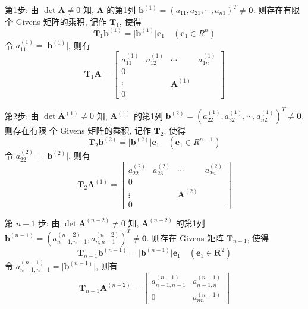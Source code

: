 \par 第1步: 由 $\det \bm{A} \neq 0$ 知, $\bm{A}$ 的第1列 $\bm{b}^{(1)} = (a_{11}, a_{21}, \cdots, a_{n1})^T \neq \bm{0}$. 则存在有限个
Givens 矩阵的乘积, 记作 $\bm{T}_1$, 使得
$$
    \bm{T}_1 \bm{b}^{(1)} = \lvert \bm{b}^{(1)} \rvert \bm{e}_1 \quad (\bm{e}_1 \in R^n)
$$
令 $a_{11}^{(1)} = \lvert \bm{b}^{(1)} \rvert$, 则有
$$
    \bm{T}_1\bm{A} =
    \left [
        \begin{array}{c|ccc}
            a_{11}^{(1)} & a_{12}^{(1)} & \cdots       & a_{1n}^{(1)} \\ \hline
            0            &              &              &              \\
            \vdots       &              & \bm{A}^{(1)} &              \\
            0            &              &              &
        \end{array}
        \right ]
$$
\par 第2步: 由 $\det\bm{A}^{(1)} \neq 0$ 知, $\bm{A}^{(1)}$ 的第1列 $\bm{b}^{(2)} = (a_{22}^{(1)}, a_{32}^{(1)}, \cdots, a_{n2}^{(1)})^T \neq \bm{0}$. 则存在有限
个 Givens 矩阵的乘积, 记作 $\bm{T}_2$, 使得
$$
    \bm{T}_2\bm{b}^{(2)} = \lvert \bm{b}^{(2)} \rvert \bm{e}_1 \quad (\bm{e}_1 \in R^{n-1})
$$
令 $a_{22}^{(2)} = \lvert \bm{b}^{(2)} \rvert$, 则有
$$
    \bm{T}_2\bm{A}^{(1)} =
    \left [
        \begin{array}{c|ccc}
            a_{22}^{(2)} & a_{23}^{(2)} & \cdots       & a_{2n}^{(2)} \\ \hline
            0            &              &              &              \\
            \vdots       &              & \bm{A}^{(2)} &              \\
            0            &              &              &
        \end{array}
        \right ]
$$
\par 第 $n-1$ 步: 由 $\det\bm{A}^{(n-2)} \neq 0$ 知, $\bm{A}^{(n-2)}$ 的第1列 $\bm{b}^{(n-1)} = (a_{n-1,n-1}^{(n-2)}, a_{n, n-1}^{(n-2)})^T \neq \bm{0}$. 则存在 Givens 矩阵 $\bm{T}_{n-1}$, 使得
$$
    \bm{T}_{n-1} \bm{b}^{(n-1)} = \lvert \bm{b}^{(n-1)} \rvert \bm{e}_1 \quad (\bm{e}_1 \in \bm{R}^2)
$$
令 $a_{n-1,n-1}^{(n-1)} = \lvert \bm{b}^{(n-1)} \rvert$, 则有
$$
    \bm{T}_{n-1}\bm{A}^{(n-2)} = \begin{bmatrix}
        a_{n-1,n-1}^{(n-1)} & a_{n-1,n}^{(n-1)} \\
        0                   & a_{nn}^{(n-1)}
    \end{bmatrix}
$$
